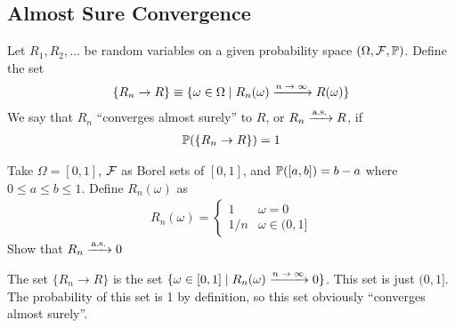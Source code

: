 \subsection{Almost Sure Convergence}
\begin{definition}
    Let $R_1, R_2, \ldots$ be random variables on a given probability space $(\Omega, \mathcal{F}, \mathbb{P})$. Define the set
    \begin{align}
        \{ R_n \to R \} \equiv \{ \omega \in \Omega \mid R_n(\omega) \ce{->[$n \to \infty$]} R(\omega) \}
    \end{align}
    We say that $R_n$ ``converges almost surely'' to $R$, or $R_n \ce{->[\text{a.s.}]} R$, if
    \begin{align}
        \mathbb{P}(\{ R_n \to R \}) = 1
    \end{align}
\end{definition}

\begin{example}
    Take $\Omega = [0,1]$, $\mathcal{F}$ as Borel sets of $[0,1]$, and $\mathbb{P}([a,b]) = b-a$ where $0 \le a \le b \le 1$. Define $R_n(\omega)$ as
    \begin{align}
        R_n(\omega) = \begin{cases}
            1 & \omega = 0\\
            1/n & \omega \in (0,1]
        \end{cases}
    \end{align}
    Show that $R_n \ce{->[\text{a.s.}]} 0$
\end{example}
\begin{solution}
    The set $\{ R_n \to R \}$ is the set $\{ \omega \in [0,1] \mid R_n(\omega) \ce{->[$n \to \infty$]} 0 \}$. This set is just $(0,1]$. The probability of this set is 1 by definition, so this set obviously ``converges almost surely''.
\end{solution}

